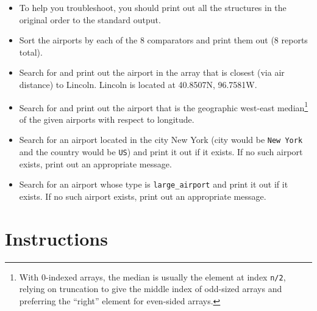 \documentclass[12pt]{scrartcl}
\begin{document}
\begin{itemize}
  \item To help you troubleshoot, you should print out all the structures
  in the original order to the standard output.
  \item Sort the airports by each of the 8 comparators and print them 
  out (8 reports total).
  \item Search for and print out the airport in the array that is closest (via 
  air distance) to Lincoln.  Lincoln is located at 40.8507N, 96.7581W.
  \item Search for and print out the airport that is the geographic west-east
  median\footnote{With 0-indexed arrays, the median is usually the element at
  index \texttt{n/2}, relying on truncation to give the middle index of
  odd-sized arrays and preferring the ``right'' element for even-sided arrays.} 
  of the given airports with respect to longitude.  
  \item Search for an airport located in the city New York (city would 
  be \texttt{New York} and the country would be 
  \texttt{US}) and print it out
  if it exists.  If no such airport exists, print out an appropriate message.
  \item Search for an airport whose type is \texttt{large_airport} and
  print it out if it exists.  If no such airport exists, print out an appropriate message.
\end{itemize}

\section*{Instructions}
\end{document}
